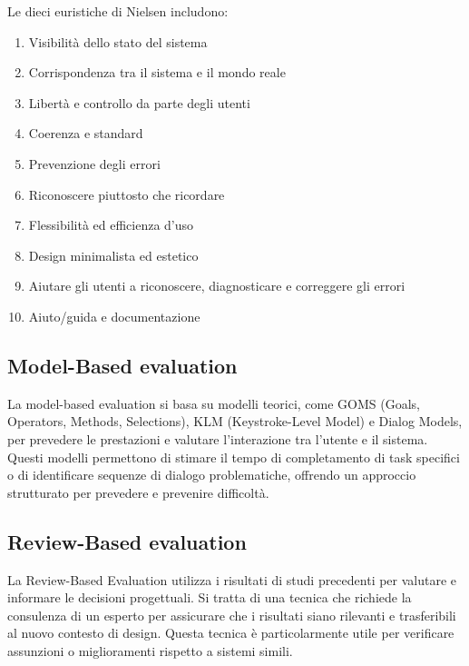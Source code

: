 Le dieci euristiche di Nielsen includono:
\begin{enumerate}
    \item Visibilità dello stato del sistema
    \item Corrispondenza tra il sistema e il mondo reale
    \item Libertà e controllo da parte degli utenti
    \item Coerenza e standard
    \item Prevenzione degli errori
    \item Riconoscere piuttosto che ricordare
    \item Flessibilità ed efficienza d'uso
    \item Design minimalista ed estetico
    \item Aiutare gli utenti a riconoscere, diagnosticare e correggere gli errori
    \item Aiuto/guida e documentazione
\end{enumerate}

\subsection{Model-Based evaluation}
La model-based evaluation si basa su modelli teorici, come GOMS (Goals, Operators, Methods, Selections), KLM (Keystroke-Level Model) e Dialog Models, per prevedere le prestazioni e valutare l’interazione tra l'utente e il sistema. Questi modelli permettono di stimare il tempo di completamento di task specifici o di identificare sequenze di dialogo problematiche, offrendo un approccio strutturato per prevedere e prevenire difficoltà.

\subsection{Review-Based evaluation}
La Review-Based Evaluation utilizza i risultati di studi precedenti per valutare e informare le decisioni progettuali. Si tratta di una tecnica che richiede la consulenza di un esperto per assicurare che i risultati siano rilevanti e trasferibili al nuovo contesto di design. Questa tecnica è particolarmente utile per verificare assunzioni o miglioramenti rispetto a sistemi simili.
